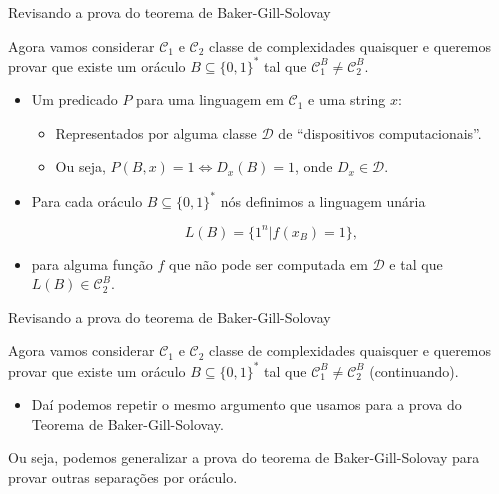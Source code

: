\documentclass[landscape, 9pt]{beamer}
\newcommand{\binalph}{\{0, 1\}}
\begin{document}

\begin{frame} {Revisando a prova do teorema de Baker-Gill-Solovay}

Agora vamos considerar $\mathcal{C}_{1}$ e $\mathcal{C}_{2}$ classe de complexidades quaisquer e queremos provar que existe um oráculo $B \subseteq \binalph^{*}$ tal que $\mathcal{C}_{1}^{B} \neq \mathcal{C}_{2}^{B}$. 

\begin{itemize}

	\item Um predicado $P$ para uma linguagem em $\mathcal{C}_{1}$ e uma string $x$:
	
	\begin{itemize}
	
		\item Representados por alguma classe $\mathcal{D}$ de ``dispositivos computacionais''.
		
		\item Ou seja, $P(B, x) = 1 \iff D_{x}(B) = 1$, onde $D_{x} \in \mathcal{D}$.
	
	\end{itemize}
	
	\item Para cada oráculo $B \subseteq \binalph^{*}$ nós definimos a linguagem unária
	
	\begin{equation*}
		L(B) = \{1^{n} \lvert f(x_{B}) = 1\},
	\end{equation*}
	
	\item para alguma função $f$ que não pode ser computada em $\mathcal{D}$ e tal que $L(B) \in \mathcal{C}_{2}^{B}$.

\end{itemize}

\end{frame}


\begin{frame} {Revisando a prova do teorema de Baker-Gill-Solovay}

Agora vamos considerar $\mathcal{C}_{1}$ e $\mathcal{C}_{2}$ classe de complexidades quaisquer e queremos provar que existe um oráculo $B \subseteq \binalph^{*}$ tal que $\mathcal{C}_{1}^{B} \neq \mathcal{C}_{2}^{B}$ (continuando). 

\begin{itemize}

	\item Daí podemos repetir o mesmo argumento que usamos para a prova do Teorema de Baker-Gill-Solovay.
	
\end{itemize}

Ou seja, podemos generalizar a prova do teorema de Baker-Gill-Solovay para provar outras separações por oráculo.

\end{frame}
\end{document}

